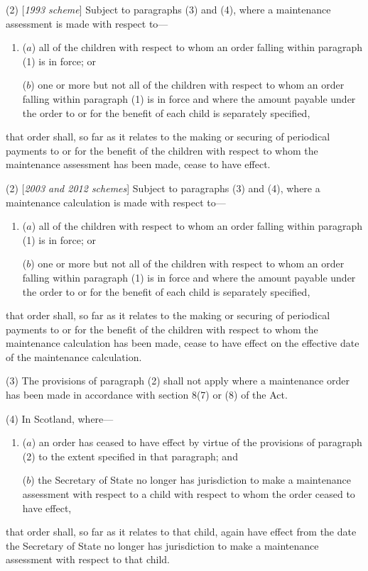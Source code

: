 \documentclass[12pt,a4paper]{article}
\begin{document}
(2) [\emph{1993 scheme}] Subject to paragraphs (3) and (4), where a maintenance assessment is made with respect to—
\begin{enumerate}\item[]
($a$) all of the children with respect to whom an order falling within paragraph (1) is in force; or

($b$) one or more but not all of the children with respect to whom an order falling within paragraph (1) is in force and where the amount payable under the order to or for the benefit of each child is separately specified,
\end{enumerate}
that order shall, so far as it relates to the making or securing of periodical payments to or for the benefit of the children with respect to whom the maintenance assessment has been made, cease to have effect.  

(2) [\emph{2003 and 2012 schemes}] Subject to paragraphs (3) and (4), where a maintenance 
calculation
is made with respect to—
\begin{enumerate}\item[]
($a$) all of the children with respect to whom an order falling within paragraph (1) is in force; or

($b$) one or more but not all of the children with respect to whom an order falling within paragraph (1) is in force and where the amount payable under the order to or for the benefit of each child is separately specified,
\end{enumerate}
that order shall, so far as it relates to the making or securing of periodical payments to or for the benefit of the children with respect to whom the maintenance 
calculation 
has been made, cease to have effect
on the effective date of the maintenance calculation.  %

(3) The provisions of paragraph (2) shall not apply where a maintenance order has been made in accordance with section 8(7) or (8) of the Act.

(4) In Scotland, where—
\begin{enumerate}\item[]
($a$) an order has ceased to have effect by virtue of the provisions of paragraph (2) to the extent specified in that paragraph; and

($b$) 
the Secretary of State  %
no longer has jurisdiction to make a maintenance assessment with respect to a child with respect to whom the order ceased to have effect,
\end{enumerate}
that order shall, so far as it relates to that child, again have effect from the date 
the Secretary of State  %
no longer has jurisdiction to make a maintenance assessment with respect to that child.
\end{document}

